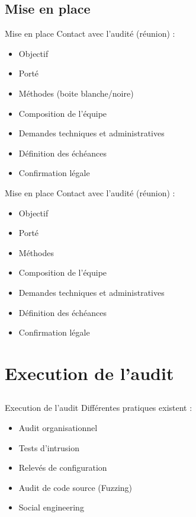 \documentclass{beamer}
\newcommand{\colorized}[1]{{\color{red}{#1}}}
\begin{document}
	\subsection{Mise en place}
	\begin{frame}{Mise en place}
	     Contact avec l'audité (réunion) : 
		\begin{itemize}
			\item Objectif
			\item Porté
			\item Méthodes (boite blanche/noire)
			\item Composition de l'équipe
			\item Demandes techniques et administratives
			\item Définition des échéances
			\item Confirmation légale
		\end{itemize}		
	\end{frame}

	\begin{frame}{Mise en place}
		Contact avec l'audité (réunion) : 
		\begin{itemize}
			\item Objectif \colorized{Connaitre le failles pour pouvoir les corriger}
			\item Porté \colorized{Application web / OWASP Top 10}
			\item Méthodes \colorized{Boite blanche}
			\item Composition de l'équipe
			\item Demandes techniques et administratives \colorized{code source}
			\item Définition des échéances \colorized{\today}
			\item Confirmation légale
		\end{itemize}		
	\end{frame}


\section{Execution de l'audit}	
	\subsection{}
		\begin{frame}{Execution de l'audit}
			Différentes pratiques existent : 
			\begin{itemize}
				\item Audit organisationnel
				\item Tests d'intrusion
				\item Relevés de configuration
				\item Audit de code source (Fuzzing)
				\item Social engineering				
			\end{itemize}		
		\end{frame}
\end{document}
